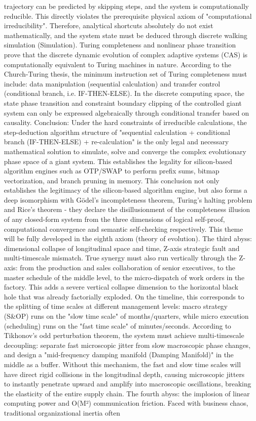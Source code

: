 \documentclass[11pt,a4paper]{article}
\begin{document}
trajectory can be predicted by skipping steps, and the system is computationally reducible. This directly violates the prerequisite physical axiom of "computational irreducibility". Therefore, analytical shortcuts absolutely do not exist mathematically, and the system state must be deduced through discrete walking simulation (Simulation). Turing completeness and nonlinear phase transition prove that the discrete dynamic evolution of complex adaptive systems (CAS) is computationally equivalent to Turing machines in nature. According to the Church-Turing thesis, the minimum instruction set of Turing completeness must include: data manipulation (sequential calculation) and transfer control (conditional branch, i.e. IF-THEN-ELSE). In the discrete computing space, the state phase transition and constraint boundary clipping of the controlled giant system can only be expressed algebraically through conditional transfer based on causality. Conclusion: Under the hard constraints of irreducible calculations, the step-deduction algorithm structure of "sequential calculation + conditional branch (IF-THEN-ELSE) + re-calculation" is the only legal and necessary mathematical solution to simulate, solve and converge the complex evolutionary phase space of a giant system. This establishes the legality for silicon-based algorithm engines such as OTP/SWAP to perform prefix sums, bitmap vectorization, and branch pruning in memory. This conclusion not only establishes the legitimacy of the silicon-based algorithm engine, but also forms a deep isomorphism with Gödel's incompleteness theorem, Turing's halting problem and Rice's theorem - they declare the disillusionment of the completeness illusion of any closed-form system from the three dimensions of logical self-proof, computational convergence and semantic self-checking respectively. This theme will be fully developed in the eighth axiom (theory of evolution). The third abyss: dimensional collapse of longitudinal space and time, Z-axis strategic fault and multi-timescale mismatch. True synergy must also run vertically through the Z-axis: from the production and sales collaboration of senior executives, to the master schedule of the middle level, to the micro-dispatch of work orders in the factory. This adds a severe vertical collapse dimension to the horizontal black hole that was already factorially exploded. On the timeline, this corresponds to the splitting of time scales at different management levels: macro strategy (S\&OP) runs on the "slow time scale" of months/quarters, while micro execution (scheduling) runs on the "fast time scale" of minutes/seconds. According to Tikhonov's odd perturbation theorem, the system must achieve multi-timescale decoupling: separate fast microscopic jitter from slow macroscopic phase changes, and design a "mid-frequency damping manifold (Damping Manifold)" in the middle as a buffer. Without this mechanism, the fast and slow time scales will have direct rigid collisions in the longitudinal depth, causing microscopic jitters to instantly penetrate upward and amplify into macroscopic oscillations, breaking the elasticity of the entire supply chain. The fourth abyss: the implosion of linear computing power and O(M²) communication friction. Faced with business chaos, traditional organizational inertia often 
\end{document}
